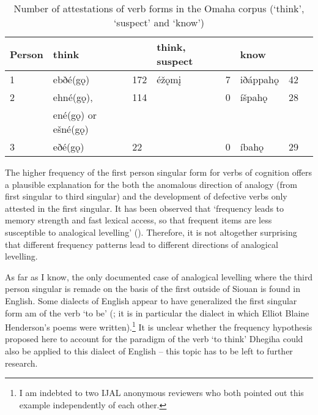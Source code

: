 \documentclass[oneside,a4paper,11pt]{article}
\newcommand{\ipa}[1]{{\phon#1}} %
\newcommand{\zh}[1]{{\cn #1}}
\begin{document}
  \begin{table}[h]
\caption{Number of attestations of verb forms in the Omaha corpus (`think', `suspect' and `know')}  \label{tab:cognition} \centering
\begin{tabular}{l|ll|ll|lll}
\toprule
Person	&think &	&	think, suspect &	&	know &	&	\\
 \midrule
1 & 	\ipa{ebðé(gǫ)}  & 	172 & 	\ipa{éžǫmį} & 	7 & 	\ipa{iðáppahǫ} & 	42 & 	\\
2 & 	\ipa{ehné(gǫ)},  & 	114 & 	 & 	0 & 	\ipa{íšpahǫ} & 	28 & 	\\
& \ipa{ené(gǫ)} or \ipa{ešné(gǫ)} &&&&\\
3 & 	\ipa{eðé(gǫ)} & 	22 & 	 & 	0 & 	\ipa{íbahǫ} & 	29 & 	\\
	\bottomrule			
\end{tabular}
\end{table} 



The higher frequency of the first person singular form for verbs of cognition offers a plausible explanation for the both the anomalous direction of analogy (from first singular to third singular) and the development of defective verbs only attested in the first singular. It has been observed that `frequency leads to memory strength and fast lexical access, so that frequent items are less susceptible to analogical levelling' (\citealt[276]{haspelmath10morpho}). Therefore, it is not altogether surprising that different frequency patterns lead to different directions of analogical levelling.

As far as I know, the only documented case of analogical levelling where the third person singular is remade on the basis of the first outside of Siouan is found in English. Some dialects of  English appear to have generalized the first singular form \ipa{am} of the verb `to be' (\citealt[163]{dillard75black}; it is in particular the dialect in which Elliot Blaine Henderson's poems were written).\footnote{I am indebted to two IJAL anonymous reviewers who both pointed out this example independently of each other.} It is unclear whether the frequency hypothesis proposed here to account for the paradigm of the verb `to think' Dhegiha could also be applied to this dialect of English -- this topic has to be left to further research.
\end{document}
